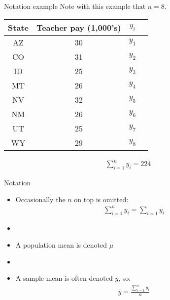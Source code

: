 \documentclass[xcolor=dvipsnames]{beamer}
\begin{document}
\begin{frame}{Notation example}
	Note with this example that $n = 8$.
	\begin{center}
		\begin{tabular}{|c|c|c|c|}
			\hline 
			\textbf{State} & \textbf{Teacher pay (1,000's)} & $y_i$ \\ 
			\hline \hline
			AZ & 30 & $y_1$\\ \hline 
			CO &  31 & $y_2$ \\ \hline 
			ID & 25 & $y_3$ \\  \hline 
			MT &  26 & $y_4$ \\ \hline 
			NV & 32 & $y_5$ \\ \hline 
			NM &  26 & $y_6$\\ \hline 
			UT &  25 & $y_7$\\ \hline 
			WY &  29 & $y_8$\\ \hline 
		\end{tabular} 
	\end{center}
	\begin{gather*}
	\sum_{i=1}^{n} y_i = 224
	\end{gather*}
\end{frame}

\begin{frame}{Notation}
	\begin{itemize}
		\item Occasionally the $n$ on top is omitted:
		\begin{gather*}
		\sum_{i=1}^{n} y_i = \sum_{i=1} y_i 
		\end{gather*}
		\item[]
		\item A population mean is denoted $\mu$
		\item[]
		\item A sample mean is often denoted $\bar{y}$, so:
		\begin{gather*}
		\bar{y} = \frac{\sum_{i=1}^{n} y_i}{n}
		\end{gather*}
	\end{itemize}
\end{frame}
\end{document}
